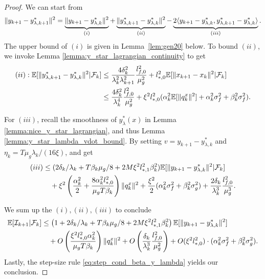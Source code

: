 \begin{proof}
We can start from 
\begin{align*}
    \|y_{k+1} - y_{\lambda, k+1}^*\|^2 = \underbrace{\|y_{k+1} - y_{\lambda, k}^*\|^2}_{(i)} + \underbrace{\|y_{\lambda, k+1}^* - y_{\lambda, k}^*\|^2}_{(ii)} - \underbrace{2\langle y_{k+1} - y_{\lambda, k}^*, y_{\lambda, k+1}^* - y_{\lambda, k}^* \rangle}_{(iii)}. 
\end{align*}
The upper bound of $(i)$ is given in Lemma~\ref{lem:gen20} below. To bound $(ii)$, we invoke Lemma \ref{lemma:y_star_lagrangian_continuity} to get 
\begin{align*}
    (ii): \mathbb{E}[\|y_{\lambda, k+1}^* - y_{\lambda, k}^*\|^2|\mathcal{F}_k] &\le \frac{4 \delta_k^2}{\lambda_k^2 \lambda_{k+1}^2} \frac{l_{f,0}^2}{\mu_g^2} + l_{*,0}^2 \mathbb{E}[\|x_{k+1} - x_k\|^2 | \mathcal{F}_k] \\
    &\le \frac{4 \delta_k^2}{\lambda_k^4} \frac{l_{f,0}^2}{\mu_g^2} + \xi^2 l_{*,0}^2(\alpha_k^2 \mathbb{E}[\|q_k^x\|^2] + \alpha_k^2 \sigma_f^2 + \beta_k^2 \sigma_f^2).
\end{align*}





For $(iii)$, recall the smoothness of $y_{\lambda}^* (x)$ in Lemma \ref{lemma:nice_y_star_lagrangian}, and thus Lemma \ref{lemma:y_star_lambda_vdot_bound}. By setting $v = y_{k+1} - y_{\lambda, k}^*$ and $\eta_k = T \mu_g \lambda_k / (16 \xi)$, and get
\begin{align*}
    (iii)&\le (2\delta_k / \lambda_k + T \beta_k \mu_g / 8 + 2 M \xi^2 l_{*,1}^2 \beta_k^2) \mathbb{E}[\|y_{k+1}-y_{\lambda,k}^*\|^2 |\mathcal{F}_k] \nonumber \\
    &\quad + \xi^2 \left(\frac{\alpha_k^2}{2} + \frac{8 \alpha_k^2 l_{*,0}^2}{\mu_g T \beta_k} \right) \|q_k^x\|^2 + \frac{\xi^2}{2} (\alpha_k^2 \sigma_f^2 + \beta_k^2 \sigma_g^2) + \frac{2 \delta_k}{\lambda_k^3} \frac{l_{f,0}^2}{\mu_g^3}.    
\end{align*}

We sum up the $(i), (ii), (iii)$ to conclude 
\begin{align}
    \Exs[\I_{k+1}| \mathcal{F}_k] &\le \left(1 + 2\delta_k/\lambda_k +  T \beta_k \mu_g / 8 + 2M\xi^2 l_{*,1}^2 \beta_k^2 \right) \Exs[\|y_{k+1} - y_{\lambda, k}^*\|^2] \nonumber\\
    &\quad + O\left(\frac{\xi^2 l_{*,0}^2 \alpha_k^2 }{\mu_gT \beta_k}\right) \|q_k^x\|^2  + O\left( \frac{\delta_k}{\lambda_k^3} \frac{l_{f,0}^2}{\mu_g^2} \right) + O(\xi^2 l_{*,0}^2) \cdot (\alpha_k^2 \sigma_f^2 + \beta_k^2 \sigma_g^2).  %
\end{align}
Lastly, the step-size rule   \eqref{eq:step_cond_beta_y_lambda} yields our conclusion.
\end{proof}

